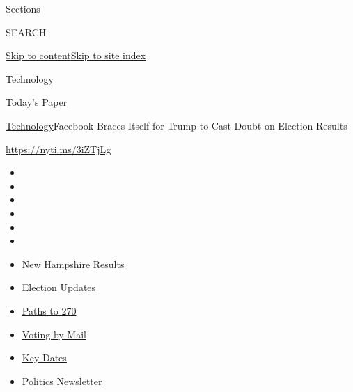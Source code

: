 Sections

SEARCH

\protect\hyperlink{site-content}{Skip to
content}\protect\hyperlink{site-index}{Skip to site index}

\href{https://www.nytimes3xbfgragh.onion/section/technology}{Technology}

\href{https://myaccount.nytimes3xbfgragh.onion/auth/login?response_type=cookie\&client_id=vi}{}

\href{https://www.nytimes3xbfgragh.onion/section/todayspaper}{Today's
Paper}

\href{/section/technology}{Technology}\textbar{}Facebook Braces Itself
for Trump to Cast Doubt on Election Results

\url{https://nyti.ms/3iZTjLg}

\begin{itemize}
\item
\item
\item
\item
\item
\item
\end{itemize}

\begin{itemize}
\item
  \href{https://www.nytimes3xbfgragh.onion/interactive/2020/09/08/us/elections/results-new-hampshire-primary-elections.html?action=click\&pgtype=Article\&state=default\&region=TOP_BANNER\&context=storylines_menu}{New
  Hampshire Results}
\item
  \href{https://www.nytimes3xbfgragh.onion/live/2020/09/08/us/trump-vs-biden?action=click\&pgtype=Article\&state=default\&region=TOP_BANNER\&context=storylines_menu}{Election
  Updates}
\item
  \href{https://www.nytimes3xbfgragh.onion/interactive/2020/us/elections/election-states-biden-trump.html?action=click\&pgtype=Article\&state=default\&region=TOP_BANNER\&context=storylines_menu}{Paths
  to 270}
\item
  \href{https://www.nytimes3xbfgragh.onion/interactive/2020/08/31/us/politics/vote-by-mail-deadlines.html?action=click\&pgtype=Article\&state=default\&region=TOP_BANNER\&context=storylines_menu}{Voting
  by Mail}
\item
  \href{https://www.nytimes3xbfgragh.onion/interactive/2019/us/elections/2020-presidential-election-calendar.html?action=click\&pgtype=Article\&state=default\&region=TOP_BANNER\&context=storylines_menu}{Key
  Dates}
\item
  \href{https://www.nytimes3xbfgragh.onion/newsletters/politics?action=click\&pgtype=Article\&state=default\&region=TOP_BANNER\&context=storylines_menu}{Politics
  Newsletter}
\end{itemize}

